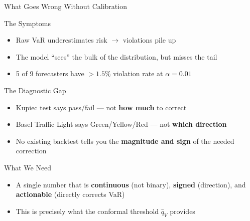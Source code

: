 \documentclass[9pt, aspectratio=169, t]{beamer}
\newcommand{\qV}{\hat{q}_V}
\begin{document}
\begin{frame}{What Goes Wrong Without Calibration}
	\vspace{-0.3cm}
	{\footnotesize
	\begin{alertblock}{The Symptoms}
		\begin{itemize}\setlength{\itemsep}{1pt}
			\item Raw VaR underestimates risk $\to$ violations pile up
			\item The model ``sees'' the bulk of the distribution, but misses the tail
			\item 5 of 9 forecasters have $> 1.5\%$ violation rate at $\alpha = 0.01$
		\end{itemize}
	\end{alertblock}
	\vspace{0mm}
	\begin{block}{The Diagnostic Gap}
		\begin{itemize}\setlength{\itemsep}{1pt}
			\item Kupiec test says pass/fail --- not \textbf{how much} to correct
			\item Basel Traffic Light says Green/Yellow/Red --- not \textbf{which direction}
			\item No existing backtest tells you the \textbf{magnitude and sign} of the needed correction
		\end{itemize}
	\end{block}
	\vspace{0mm}
	\begin{alertblock}{What We Need}
		\begin{itemize}\setlength{\itemsep}{1pt}
			\item A single number that is \textbf{continuous} (not binary), \textbf{signed} (direction), and \textbf{actionable} (directly corrects VaR)
			\item This is precisely what the conformal threshold $\qV$ provides
		\end{itemize}
	\end{alertblock}
	}
\end{frame}
\end{document}
